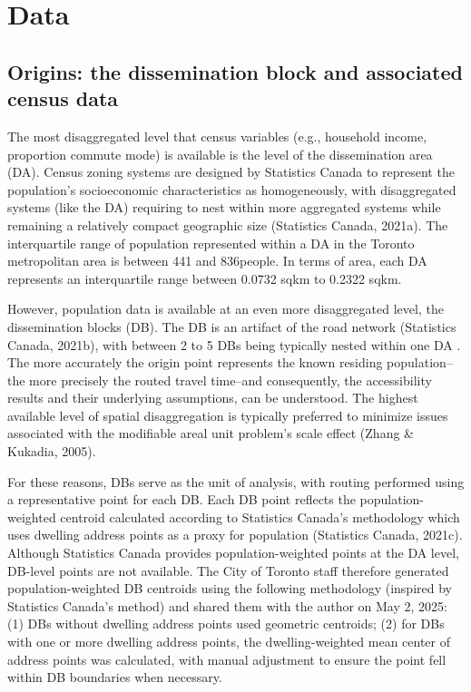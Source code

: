 \documentclass[
11pt, %
oneside, %
english, %
singlespacing, %
]{macthesis} %
\begin{document}
\section{Data}\label{data}

\subsection{Origins: the dissemination block and associated census data}\label{origins-the-dissemination-block-and-associated-census-data}

The most disaggregated level that census variables (e.g., household income, proportion commute mode) is available is the level of the dissemination area (DA). Census zoning systems are designed by Statistics Canada to represent the population's socioeconomic characteristics as homogeneously, with disaggregated systems (like the DA) requiring to nest within more aggregated systems while remaining a relatively compact geographic size (Statistics Canada, 2021a). The interquartile range of population represented within a DA in the Toronto metropolitan area is between 441 and 836people. In terms of area, each DA represents an interquartile range between 0.0732 sqkm to 0.2322 sqkm.

However, population data is available at an even more disaggregated level, the dissemination blocks (DB). The DB is an artifact of the road network (Statistics Canada, 2021b), with between 2 to 5 DBs being typically nested within one DA . The more accurately the origin point represents the known residing population--the more precisely the routed travel time--and consequently, the accessibility results and their underlying assumptions, can be understood. The highest available level of spatial disaggregation is typically preferred to minimize issues associated with the modifiable areal unit problem's scale effect (Zhang \& Kukadia, 2005).

For these reasons, DBs serve as the unit of analysis, with routing performed using a representative point for each DB. Each DB point reflects the population-weighted centroid calculated according to Statistics Canada's methodology which uses dwelling address points as a proxy for population (Statistics Canada, 2021c). Although Statistics Canada provides population-weighted points at the DA level, DB-level points are not available. The City of Toronto staff therefore generated population-weighted DB centroids using the following methodology (inspired by Statistics Canada's method) and shared them with the author on May 2, 2025: (1) DBs without dwelling address points used geometric centroids; (2) for DBs with one or more dwelling address points, the dwelling-weighted mean center of address points was calculated, with manual adjustment to ensure the point fell within DB boundaries when necessary.
\end{document}
